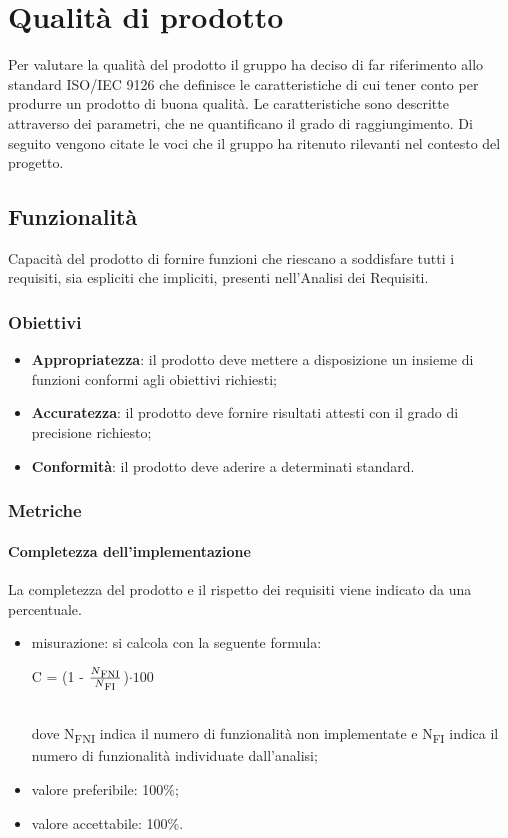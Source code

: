 \section{Qualità di prodotto}
Per valutare la qualità del prodotto il gruppo ha deciso di far riferimento allo standard ISO/IEC 9126\glosp{} che definisce le caratteristiche di cui tener conto per produrre un prodotto di buona qualità. Le caratteristiche sono descritte attraverso dei parametri, che ne quantificano il grado di raggiungimento. Di seguito vengono citate le voci che il gruppo ha ritenuto rilevanti nel contesto del progetto.
	\subsection{Funzionalità}
	Capacità del prodotto di fornire funzioni che riescano a soddisfare tutti i requisiti, sia espliciti che impliciti, presenti nell'Analisi dei Requisiti.
		\subsubsection{Obiettivi}
		\begin{itemize}
			\item \textbf{Appropriatezza}: il prodotto deve mettere a disposizione un insieme di funzioni conformi agli obiettivi richiesti;
			\item \textbf{Accuratezza}: il prodotto deve fornire risultati attesti con il grado di precisione richiesto;
			\item \textbf{Conformità}: il prodotto deve aderire a determinati standard. %
		\end{itemize}
		\subsubsection{Metriche}
			\paragraph{Completezza dell'implementazione}
			La completezza del prodotto e il rispetto dei requisiti viene indicato da una percentuale.
			\begin{itemize}
			\item misurazione: si calcola con la seguente formula: \\
			\centerline { C = (1 - \(\frac{N\textsubscript{FNI}}{N\textsubscript{FI}} \))$ \cdot  100$ } \\
			dove N\textsubscript{FNI} indica il numero di funzionalità non implementate e N\textsubscript{FI} indica il numero di funzionalità individuate dall'analisi;
			\item valore preferibile: 100\%;
			\item valore accettabile: 100\%.
			\end{itemize}
